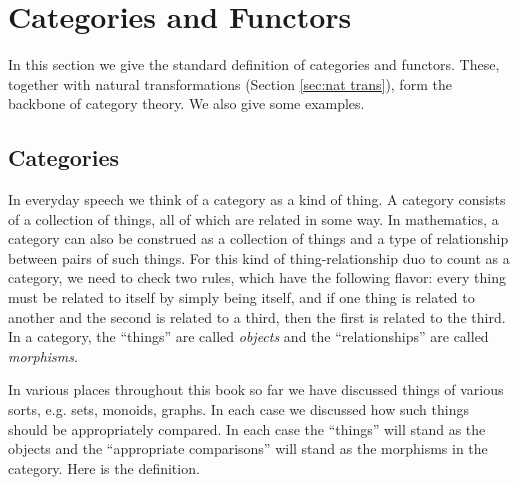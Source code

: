 

\section{Categories and Functors}

In this section we give the standard definition of categories and functors. These, together with natural transformations (Section \ref{sec:nat trans}), form the backbone of category theory. We also give some examples.


\subsection{Categories}\label{sec:categories}

In everyday speech we think of a category as a kind of thing. A category consists of a collection of things, all of which are related in some way. In mathematics, a category can also be construed as a collection of things and a type of relationship between pairs of such things. For this kind of thing-relationship duo to count as a category, we need to check two rules, which have the following flavor: every thing must be related to itself by simply being itself, and if one thing is related to another and the second is related to a third, then the first is related to the third. In a category, the “things” are called {\em objects} and the “relationships” are called {\em morphisms}.

In various places throughout this book so far we have discussed things of various sorts, e.g. sets, monoids, graphs. In each case we discussed how such things should be appropriately compared. In each case the “things” will stand as the objects and the “appropriate comparisons” will stand as the morphisms in the category. Here is the definition.

